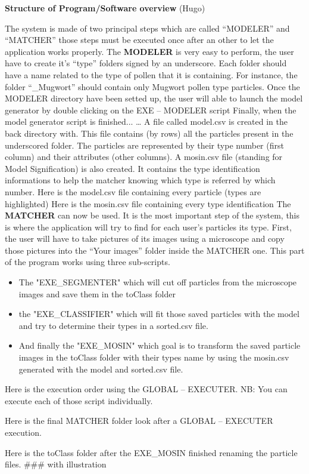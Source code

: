 \textbf{Structure of Program/Software overview} (Hugo) 

The system is made of two principal steps which are called “MODELER” and “MATCHER” those steps must be executed once after an other to let the application works properly.
The \textbf{MODELER} is very easy to perform, the user have to create it's “type” folders signed by an underscore.
Each folder should have a name related to the type of pollen that it is containing. For instance, the folder “_Mugwort” should contain only Mugwort pollen type particles.
Once the MODELER directory have been setted up, the user will able to launch the model generator by double clicking on the EXE – MODELER script
Finally, when the model generator script is finished...
… A file called model.csv is created in the back directory with. This file contains (by rows) all the particles present in the underscored folder. The particles are represented by their type number (first column) and their attributes (other columns).
A mosin.csv file (standing for Model Signification) is also created. It contains the type identification informations to help the matcher knowing which type is referred by which number.
Here is the model.csv file containing every particle (types are highlighted)
Here is the mosin.csv file containing every type identification
The \textbf{MATCHER} can now be used. It is the most important step of the system, this is where the application will try to find for each user's particles its type.
First, the user will have to take pictures of its images using a microscope and copy those pictures into the “Your images” folder inside the MATCHER one.
This part of the program works using three sub-scripts.

\begin{itemize}
\item The "EXE_SEGMENTER" which will cut off particles from the microscope images and save them in the toClass folder

\item the "EXE_CLASSIFIER" which will fit those saved particles with the model and try to determine their types in a sorted.csv file.

\item And finally the "EXE_MOSIN" which goal is to transform the saved particle images in the toClass folder with their types name by using the mosin.csv generated with the model and sorted.csv file.
\end{itemize}

Here is the execution order using the GLOBAL – EXECUTER.
NB: You can execute each of those script individually.

Here is the final MATCHER folder look after a GLOBAL – EXECUTER execution.

Here is the toClass folder after the EXE_MOSIN finished renaming the particle files.
### with illustration
    
    
    